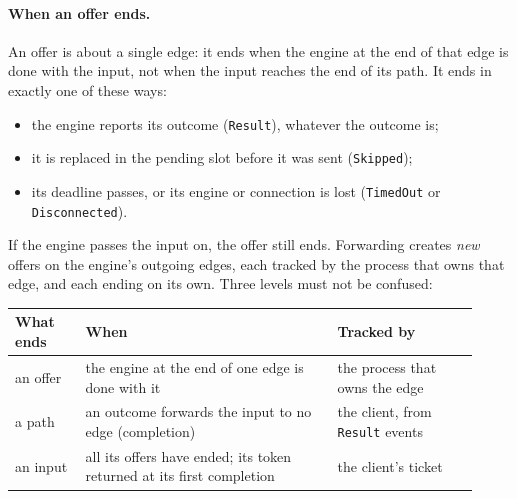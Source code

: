 \documentclass[11pt]{article}
\newcommand{\code}[1]{\texttt{#1}}
\begin{document}
\paragraph{When an offer ends.} An offer is about a single edge: it ends when
the engine at the end of that edge is done with the input, not when the input
reaches the end of its path. It ends in exactly one of these ways:
\begin{itemize}[nosep]
  \item the engine reports its outcome (\code{Result}), whatever the outcome
        is;
  \item it is replaced in the pending slot before it was sent
        (\code{Skipped});
  \item its deadline passes, or its engine or connection is lost
        (\code{TimedOut} or \code{Disconnected}).
\end{itemize}
If the engine passes the input on, the offer still ends. Forwarding creates
\emph{new} offers on the engine's outgoing edges, each tracked by the process
that owns that edge, and each ending on its own. Three levels must not be
confused:
\begin{center}
\small
\begin{tabular}{@{}p{0.14\linewidth}p{0.5\linewidth}p{0.28\linewidth}@{}}
\toprule
What ends & When & Tracked by \\
\midrule
an offer      & the engine at the end of one edge is done with it
              & the process that owns the edge \\
a path        & an outcome forwards the input to no edge (completion)
              & the client, from \code{Result} events \\
an input      & all its offers have ended; its token returned at its first
                completion & the client's ticket \\
\bottomrule
\end{tabular}
\end{center}
\end{document}
